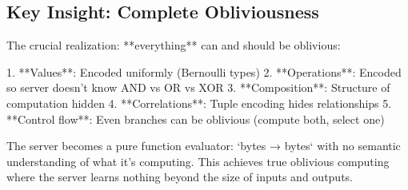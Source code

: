 \subsection{Key Insight: Complete Obliviousness}

The crucial realization: **everything** can and should be oblivious:

1. **Values**: Encoded uniformly (Bernoulli types)
2. **Operations**: Encoded so server doesn't know AND vs OR vs XOR
3. **Composition**: Structure of computation hidden
4. **Correlations**: Tuple encoding hides relationships
5. **Control flow**: Even branches can be oblivious (compute both, select one)

The server becomes a pure function evaluator: `bytes → bytes` with no semantic understanding of what it's computing. This achieves true oblivious computing where the server learns nothing beyond the size of inputs and outputs.